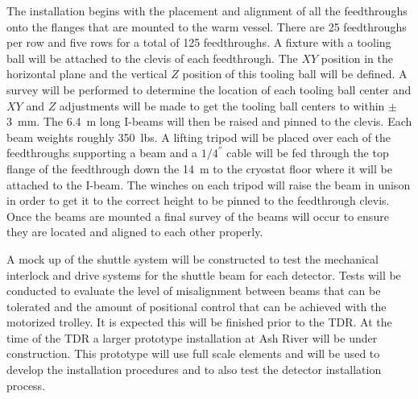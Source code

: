 The  installation begins with the placement and alignment of all
the feedthroughs onto the flanges that are mounted to the warm vessel.
There are \num{25} feedthroughs per row and five rows for a total of \num{125}
feedthroughs.  A fixture with a tooling ball will be attached to the
clevis of each feedthrough.  The $XY$ position in the horizontal plane
and the vertical $Z$ position of this tooling ball will be defined.  A
survey will be performed to determine the location of each tooling
ball center and $XY$ and $Z$ adjustments will be made to get the tooling
ball centers to within $\pm$\SI{3}{mm}.  The \SI{6.4}{m} long I-beams will then be
raised and pinned to the clevis.  Each beam weights roughly 350~lbs.
A lifting tripod will be placed over each of the feedthroughs
supporting a beam and a $1/4 ^{''}$ cable will be fed through the top
flange of the feedthrough down the \SI{14}{m} to the cryostat floor where it
will be attached to the I-beam.  The winches on each tripod will raise
the beam in unison in order to get it to the correct height to be
pinned to the feedthrough clevis.  Once the beams are mounted a final
survey of the beams will occur to ensure they are located and aligned
to each other properly.

A mock up of the shuttle system will be constructed to test the
mechanical interlock and drive systems for the shuttle beam
for each detector.  Tests will be conducted to evaluate the level of
misalignment between beams that can be tolerated and the amount of
positional control that can be achieved with the motorized trolley. It
is expected this will be finished prior to the TDR. At the time of the
TDR a larger prototype installation at Ash River will be under
construction. This prototype will use full scale elements and will be
used to develop the installation procedures and to also test the
detector installation process.
